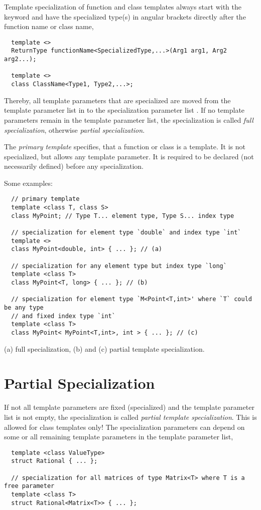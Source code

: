 Template specialization of function and class templates always start with the keyword  and have the specialized type(s) in angular brackets
directly after the function name or class name, \eg
%
\begin{verbatim}
  template <>
  ReturnType functionName<SpecializedType,...>(Arg1 arg1, Arg2 arg2...);

  template <>
  class ClassName<Type1, Type2,...>;
\end{verbatim}
%
Thereby, all template parameters that are specialized are moved from the template parameter list in  to the specialization parameter list
. If no template parameters remain in the template parameter list, the specialization is called \emph{full specialization},
otherwise \emph{partial specialization}.

The \emph{primary template} specifies, that a function or class is a template. It is not specialized, but allows any template parameter. It is required to be
declared (not necessarily defined) before any specialization.

Some examples:
\begin{verbatim}
  // primary template
  template <class T, class S>
  class MyPoint; // Type T... element type, Type S... index type

  // specialization for element type `double` and index type `int`
  template <>
  class MyPoint<double, int> { ... }; // (a)

  // specialization for any element type but index type `long`
  template <class T>
  class MyPoint<T, long> { ... }; // (b)

  // specialization for element type `M<Point<T,int>' where `T` could be any type
  // and fixed index type `int`
  template <class T>
  class MyPoint< MyPoint<T,int>, int > { ... }; // (c)
\end{verbatim}
(a) full specialization, (b) and (c) partial template specialization.


\section{Partial Specialization}\label{seq:partial_template_specialization}
If not all template parameters are fixed (specialized) and the template parameter list is not empty, the specialization is called
\emph{partial template specialization}. This is allowed for class templates only! The specialization parameters can depend on some or all remaining
template parameters in the template parameter list, \eg
%
\begin{verbatim}
  template <class ValueType>
  struct Rational { ... };

  // specialization for all matrices of type Matrix<T> where T is a free parameter
  template <class T>
  struct Rational<Matrix<T>> { ... };
\end{verbatim}

